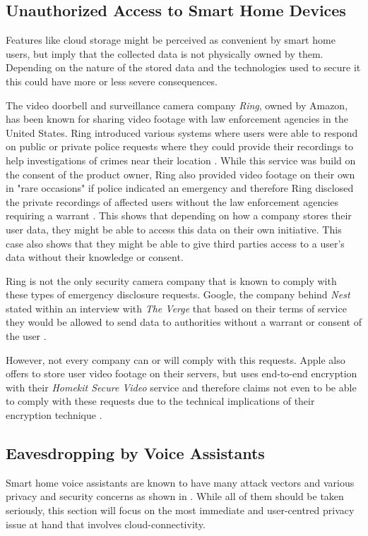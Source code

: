 \subsection{Unauthorized Access to Smart Home Devices}
Features like cloud storage might be perceived as convenient by smart home users, but imply that the collected data is not physically owned by them. Depending on the nature of the stored data and the technologies used to secure it this could have more or less severe consequences.

The video doorbell and surveillance camera company \textit{Ring}, owned by Amazon, has been known for sharing video footage with law enforcement agencies in the United States. Ring introduced various systems where users were able to respond on public or private police requests where they could provide their recordings to help investigations of crimes near their location \cite{Kaur2024Ring}. While this service was build on the consent of the product owner, Ring also provided video footage on their own in "rare occasions" if police indicated an emergency and therefore Ring disclosed the private recordings of affected users without the law enforcement agencies requiring a warrant \cite{Kaur2024Ring}. This shows that depending on how a company stores their user data, they might be able to access this data on their own initiative. This case also shows that they might be able to give third parties access to a user's data without their knowledge or consent.

Ring is not the only security camera company that is known to comply with these types of emergency disclosure requests. Google, the company behind \textit{Nest} stated within an interview with \textit{The Verge} that based on their terms of service they would be allowed to send data to authorities without a warrant or consent of the user \cite{Clark2022Nest}.

However, not every company can or will comply with this requests. Apple also offers to store user video footage on their servers, but uses end-to-end encryption with their \textit{Homekit Secure Video} service \cite{Kastrenakes2019HKSC} and therefore claims not even to be able to comply with these requests due to the technical implications of their encryption technique \cite{Clark2022Nest}.

\subsection{Eavesdropping by Voice Assistants}
Smart home voice assistants are known to have many attack vectors and various privacy and security concerns as shown in \cite{SHPA-10.1145/3412383}. While all of them should be taken seriously, this section will focus on the most immediate and user-centred privacy issue at hand that involves cloud-connectivity.

